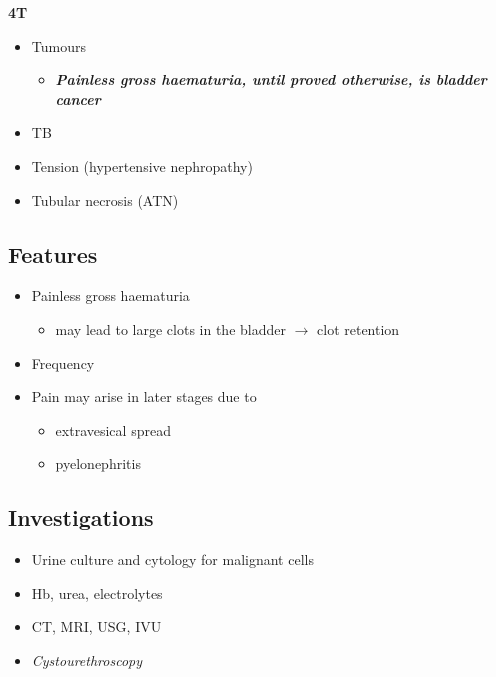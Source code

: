 \documentclass[
  12pt,
]{memoir}
\providecommand{\tightlist}{%
  \setlength{\itemsep}{0pt}\setlength{\parskip}{0pt}}
\begin{document}
\textbf{4T}

\begin{itemize}
\tightlist
\item
  Tumours

  \begin{itemize}
  \tightlist
  \item
    \emph{\textbf{Painless gross haematuria, until proved otherwise, is
    bladder cancer}}
  \end{itemize}
\item
  TB
\item
  Tension (hypertensive nephropathy)
\item
  Tubular necrosis (ATN)
\end{itemize}

\hypertarget{features-7}{%
\subsection{Features}\label{features-7}}

\begin{itemize}
\tightlist
\item
  Painless gross haematuria

  \begin{itemize}
  \tightlist
  \item
    may lead to large clots in the bladder \(\rightarrow\) clot
    retention
  \end{itemize}
\item
  Frequency
\item
  Pain may arise in later stages due to

  \begin{itemize}
  \tightlist
  \item
    extravesical spread
  \item
    pyelonephritis
  \end{itemize}
\end{itemize}

\hypertarget{investigations-6}{%
\subsection{Investigations}\label{investigations-6}}

\begin{itemize}
\tightlist
\item
  Urine culture and cytology for malignant cells
\item
  Hb, urea, electrolytes
\item
  CT, MRI, USG, IVU
\item
  \emph{Cystourethroscopy}
\end{itemize}
\end{document}
